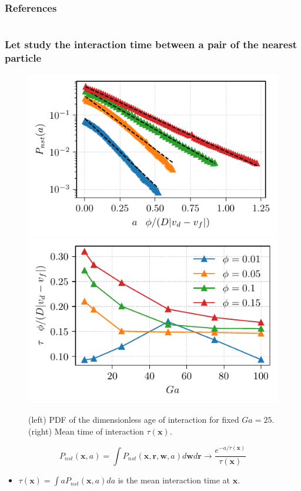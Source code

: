 \documentclass{sintefbeamer}
\begin{document}
\begin{frame}[t]
  \frametitle{References}
  
\end{frame}

 
\backmatter


\section*{}

\begin{frame}
  \frametitle{Let study the interaction time between  a pair of the nearest particle}
    \begin{figure}
        \includegraphics[height=0.23\textwidth]{image/HOMOGENEOUS/fDrop/P_a_Ga_25.pdf}
        \includegraphics[height=0.23\textwidth]{image/HOMOGENEOUS/fPA/ageGa.pdf}
        \caption{ (left) PDF of the dimensionless age of interaction for fixed $Ga = 25$.
      (right) Mean time of interaction $\tau(\textbf{x})$.}
    \end{figure}
  \begin{equation*}
    P_{nst}(\textbf{x},a) 
    = \int P_{nst}(\textbf{x},\textbf{r},\textbf{w},a) d\textbf{w}d\textbf{r}
    \rightarrow\frac{e^{-a/\tau(\textbf{x})}}{\tau(\textbf{x})}
  \end{equation*}
\begin{itemize}
  \item $\tau(\textbf{x}) = \int a P_{nst}(\textbf{x},a) da$ is the mean interaction time at $\textbf{x}$. 
\end{itemize}
\end{frame}
\end{document}
